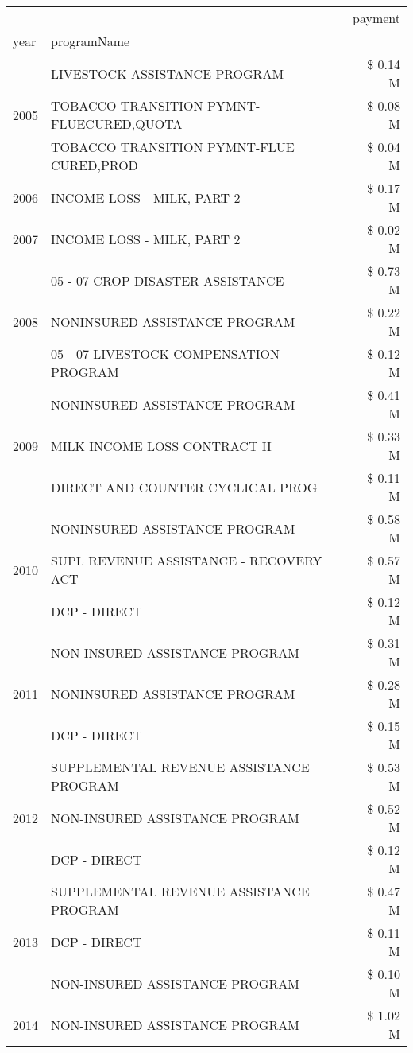 \begin{tabular}{llr}
\toprule
 &  & payment \\
year & programName &  \\
\midrule
\multirow[t]{3}{*}{2005} & LIVESTOCK ASSISTANCE PROGRAM & \$ 0.14 M \\
 & TOBACCO TRANSITION PYMNT-FLUECURED,QUOTA & \$ 0.08 M \\
 & TOBACCO TRANSITION PYMNT-FLUE CURED,PROD & \$ 0.04 M \\
\cline{1-3}
2006 & INCOME LOSS - MILK, PART 2 & \$ 0.17 M \\
\cline{1-3}
2007 & INCOME LOSS - MILK, PART 2 & \$ 0.02 M \\
\cline{1-3}
\multirow[t]{3}{*}{2008} & 05 - 07 CROP DISASTER ASSISTANCE & \$ 0.73 M \\
 & NONINSURED ASSISTANCE PROGRAM & \$ 0.22 M \\
 & 05 - 07 LIVESTOCK COMPENSATION PROGRAM & \$ 0.12 M \\
\cline{1-3}
\multirow[t]{3}{*}{2009} & NONINSURED ASSISTANCE PROGRAM & \$ 0.41 M \\
 & MILK INCOME LOSS CONTRACT II & \$ 0.33 M \\
 & DIRECT AND COUNTER CYCLICAL PROG & \$ 0.11 M \\
\cline{1-3}
\multirow[t]{3}{*}{2010} & NONINSURED ASSISTANCE PROGRAM & \$ 0.58 M \\
 & SUPL REVENUE ASSISTANCE - RECOVERY ACT & \$ 0.57 M \\
 & DCP - DIRECT & \$ 0.12 M \\
\cline{1-3}
\multirow[t]{3}{*}{2011} & NON-INSURED ASSISTANCE PROGRAM & \$ 0.31 M \\
 & NONINSURED ASSISTANCE PROGRAM & \$ 0.28 M \\
 & DCP - DIRECT & \$ 0.15 M \\
\cline{1-3}
\multirow[t]{3}{*}{2012} & SUPPLEMENTAL REVENUE ASSISTANCE PROGRAM & \$ 0.53 M \\
 & NON-INSURED ASSISTANCE PROGRAM & \$ 0.52 M \\
 & DCP - DIRECT & \$ 0.12 M \\
\cline{1-3}
\multirow[t]{3}{*}{2013} & SUPPLEMENTAL REVENUE ASSISTANCE PROGRAM & \$ 0.47 M \\
 & DCP - DIRECT & \$ 0.11 M \\
 & NON-INSURED ASSISTANCE PROGRAM & \$ 0.10 M \\
\cline{1-3}
\multirow[t]{3}{*}{2014} & NON-INSURED ASSISTANCE PROGRAM & \$ 1.02 M \\

\end{tabular}

